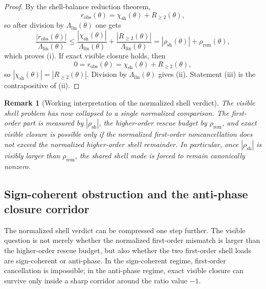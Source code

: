 \documentclass[12pt,a4paper]{article}
\newtheorem{remark}[theorem]{Remark}
\begin{document}
\begin{proof}
By the shell-balance reduction theorem,
\[
 r_{\mathrm{obs}}(\theta)=\chi_{\mathrm{sh}}(\theta)+R_{\ge 2}(\theta),
\]
so after division by $\Lambda_{\mathrm{lin}}(\theta)$ one gets
\[
 \frac{|r_{\mathrm{obs}}(\theta)|}{\Lambda_{\mathrm{lin}}(\theta)}
 \le \frac{|\chi_{\mathrm{sh}}(\theta)|}{\Lambda_{\mathrm{lin}}(\theta)}+\frac{|R_{\ge 2}(\theta)|}{\Lambda_{\mathrm{lin}}(\theta)}
 =|\rho_{\mathrm{sh}}(\theta)|+\rho_{\mathrm{rem}}(\theta),
\]
which proves (i). If exact visible closure holds, then
\[
 0=r_{\mathrm{obs}}(\theta)=\chi_{\mathrm{sh}}(\theta)+R_{\ge 2}(\theta),
\]
so $|\chi_{\mathrm{sh}}(\theta)|=|R_{\ge 2}(\theta)|$. Division by $\Lambda_{\mathrm{lin}}(\theta)$ gives (ii). Statement (iii) is the contrapositive of (ii).
\end{proof}

\begin{remark}[Working interpretation of the normalized shell verdict]
The visible shell problem has now collapsed to a single normalized comparison. The first-order part is measured by $|\rho_{\mathrm{sh}}|$, the higher-order rescue budget by $\rho_{\mathrm{rem}}$, and exact visible closure is possible only if the normalized first-order noncancellation does not exceed the normalized higher-order shell remainder. In particular, once $|\rho_{\mathrm{sh}}|$ is visibly larger than $\rho_{\mathrm{rem}}$, the shared shell mode is forced to remain canonically nonzero.
\end{remark}


\subsection*{Sign-coherent obstruction and the anti-phase closure corridor}
The normalized shell verdict can be compressed one step further. The visible question is not merely whether the normalized first-order mismatch is larger than the higher-order rescue budget, but also whether the two first-order shell loads are sign-coherent or anti-phase. In the sign-coherent regime, first-order cancellation is impossible; in the anti-phase regime, exact visible closure can survive only inside a sharp corridor around the ratio value $-1$.
\end{document}
